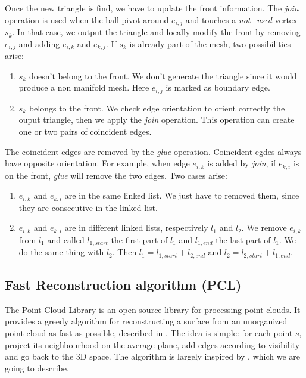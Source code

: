\documentclass[a4paper]{article}
\begin{document}
Once the new triangle is find, we have to update the front information. The \textit{join} operation is used when the ball pivot around $e_{i,j}$ and touches a \textit{not\_used} vertex $s_k$. In that case, we output the triangle and locally modify the front by removing $e_{i,j}$ and adding $e_{i,k}$ and $e_{k,j}$. If $s_k$ is already part of the mesh, two possibilities arise:
\begin{enumerate}
\item $s_k$ doesn't belong to the front. We don't generate the triangle since it would produce a non manifold mesh. Here $e_{i,j}$ is marked as boundary edge.
\item $s_k$ belongs to the front. We check edge orientation to orient correctly the ouput triangle, then we apply the \textit{join} operation. This operation can create one or two pairs of coincident edges.
\end{enumerate}

The coincident edges are removed by the \textit{glue} operation. Coincident egdes always have opposite orientation. For example, when edge $e_{i,k}$ is added by \textit{join}, if $e_{k,i}$ is on the front, \textit{glue} will remove the two edges. Two cases arise:
\begin{enumerate}
\item $e_{i,k}$ and $e_{k,i}$ are in the same linked list. We just have to removed them, since they are consecutive in the linked list.
\item $e_{i,k}$ and $e_{k,i}$ are in different linked lists, respectively $l_1$ and $l_2$. We remove $e_{i,k}$ from $l_1$ and called $l_{1,start}$ the first part of $l_1$ and $l_{1,end}$ the last part of $l_1$. We do the same thing with $l_2$. Then $l_1 = l_{1,start}+l_{2,end}$ and $l_2 = l_{2,start}+l_{1,end}$.
\end{enumerate}


\subsection{Fast Reconstruction algorithm (PCL)}
The Point Cloud Library is an open-source library for processing point clouds. It provides a greedy algorithm for reconstructing a surface from an unorganized point cloud as fast as possible, described in \cite{PCL1}. The idea is simple: for each point $s$, project its neighbourhood on the average plane, add edges according to visibility and go back to the 3D space. The algorithm is largely inspired by \cite{PCL2}, which we are going to describe.
\end{document}
